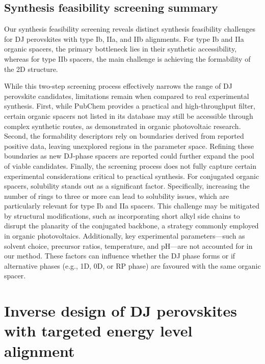 \subsection{Synthesis feasibility screening summary}

Our synthesis feasibility screening reveals distinct synthesis feasibility challenges for DJ perovskites with type Ib, IIa, and IIb alignments. For type Ib and IIa organic spacers, the primary bottleneck lies in their synthetic accessibility, whereas for type IIb spacers, the main challenge is achieving the formability of the 2D structure. 

While this two-step screening process effectively narrows the range of DJ perovskite candidates, limitations remain when compared to real experimental synthesis. 
First, while PubChem provides a practical and high-throughput filter, certain organic spacers not listed in its database may still be accessible through complex synthetic routes, as demonstrated in organic photovoltaic research\cite{RN282}. 
Second, the formability descriptors rely on boundaries derived from reported positive data, leaving unexplored regions in the parameter space. Refining these boundaries as new DJ-phase spacers are reported could further expand the pool of viable candidates. 
Finally, the screening process does not fully capture certain experimental considerations critical to practical synthesis. For conjugated organic spacers, solubility stands out as a significant factor. Specifically, increasing the number of rings to three or more can lead to solubility issues\cite{RN304}, which are particularly relevant for type Ib and IIa spacers. This challenge may be mitigated by structural modifications, such as incorporating short alkyl side chains to disrupt the planarity of the conjugated backbone, a strategy commonly employed in organic photovoltaics\cite{RN282,RN619}. Additionally, key experimental parameters—such as solvent choice, precursor ratios, temperature, and pH—are not accounted for in our method. These factors can influence whether the DJ phase forms or if alternative phases (e.g., 1D, 0D, or RP phase) are favoured with the same organic spacer\cite{RN12}. 

\section{Inverse design of DJ perovskites with targeted energy level alignment}\label{section:section5-2}

